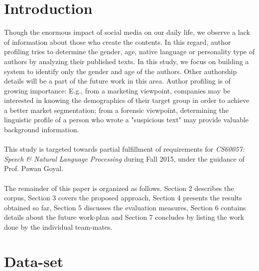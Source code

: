 \documentclass{sig-alternate}
\begin{document}
\section{Introduction}
Though the enormous impact of social media on our daily life, we observe a lack of
information about those who create the contents. In this regard, author profiling tries to
determine the gender, age, native language or personality type of authors by analyzing
their published texts. In this study, we focus on building a system to identify only the gender and age of the authors. Other authorship details will be a part of the future work in this area. Author profiling is of growing importance: E.g., from a marketing
viewpoint, companies may be interested in knowing the demographics of their target
group in order to achieve a better market segmentation; from a forensic viewpoint, determining
the linguistic profile of a person who wrote a "suspicious text" may provide
valuable background information.\\\\
This study is targeted towards partial fulfillment of requirements for \textit{CS60057: Speech \& Natural Language Processing} during Fall 2015, under the guidance of Prof. Pawan Goyal.\\\\
The remainder of this paper is organized as follows. Section 2 describes the corpus, Section 3 covers the proposed approach, Section 4 presents the results obtained so far, Section 5 discusses the evaluation measures, Section 6 contains details about the future work-plan and Section 7 concludes by listing the work done by the individual team-mates.\\
\section{Data-set}
\end{document}
